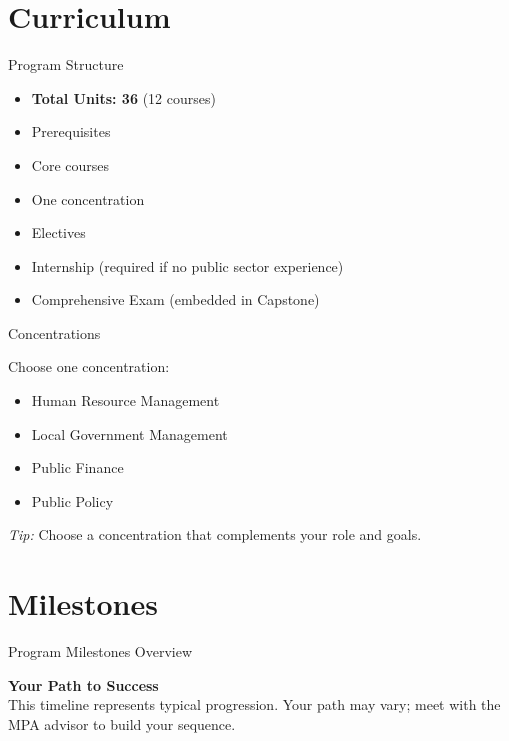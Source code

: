 \documentclass[10pt]{beamer}
\begin{document}
\section{\textcolor{titanorange}{Curriculum}}

\begin{frame}{Program Structure}
\begin{Large}
\begin{itemize}
  \item \textbf{Total Units: 36} (12 courses)
  \item Prerequisites
  \item Core courses
  \item One concentration
  \item Electives
  \item Internship (required if no public sector experience)
  \item Comprehensive Exam (embedded in Capstone)
\end{itemize}
\end{Large}
\end{frame}

\begin{frame}{Concentrations}
\begin{Large}
Choose one concentration:
\begin{itemize}
  \item Human Resource Management
  \item Local Government Management
  \item Public Finance
  \item Public Policy
\end{itemize}
\emph{Tip:} Choose a concentration that complements your role and goals.
\end{Large}
\end{frame}

\section{\textcolor{titanorange}{Milestones}}
\begin{frame}{Program Milestones Overview}
\begin{Large}
\centering
\textbf{Your Path to Success}\\[4pt]
\small This timeline represents typical progression. Your path may vary; meet with the MPA advisor to build your sequence.
\end{Large}
\end{frame}
\end{document}

